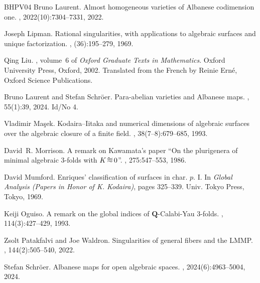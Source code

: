 \documentclass[10pt,abstract=true]{scrartcl}
\numberwithin{equation}{section}
\theoremstyle{definition}
\theoremstyle{remark}
\begin{document}
\begin{thebibliography}{BHPV04}
Bruno Laurent.
\newblock Almost homogeneous varieties of {Albanese} codimension one.
, 2022(10):7304--7331, 2022.

Joseph Lipman.
\newblock Rational singularities, with applications to algebraic surfaces and unique factorization.
, (36):195--279, 1969.

Qing Liu.
, volume~6 of {\em Oxford Graduate Texts in Mathematics}.
\newblock Oxford University Press, Oxford, 2002.
\newblock Translated from the French by Reinie Ern\'{e}, Oxford Science Publications.

Bruno Laurent and Stefan Schr{\"o}er.
\newblock Para-abelian varieties and {Albanese} maps.
, 55(1):39, 2024.
\newblock Id/No 4.

Vladimir Ma\c{s}ek.
\newblock Kodaira--Iitaka and numerical dimensions of algebraic surfaces over the algebraic closure of a finite field.
, 38(7--8):679--685, 1993.

David~R. Morrison.
\newblock A remark on {Kawamata}'s paper ``{On} the plurigenera of minimal algebraic 3-folds with {$K\mathop {\protect \rlap {\raise 3.25pt\hbox {$\sim $}}\protect \rlap {$\approx $}\protect \phantom {\approx }}0$}''.
, 275:547--553, 1986.

David Mumford.
\newblock Enriques' classification of surfaces in char. {$p$}. {I}.
\newblock In {\em Global Analysis (Papers in Honor of K. Kodaira)}, pages 325--339. Univ. Tokyo Press, Tokyo, 1969.

Keiji Oguiso.
\newblock A remark on the global indices of {$\mathbf{Q}$-Calabi-Yau $3$-folds}.
, 114(3):427--429, 1993.

Zsolt Patakfalvi and Joe Waldron.
\newblock Singularities of general fibers and the {LMMP}.
, 144(2):505--540, 2022.

Stefan Schr{\"o}er.
\newblock Albanese maps for open algebraic spaces.
, 2024(6):4963--5004, 2024.


\end{thebibliography}
\end{document}
